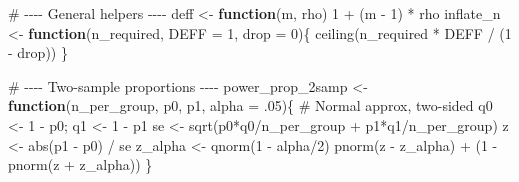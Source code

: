 \documentclass[
  letterpaper,
  DIV=11,
  numbers=noendperiod]{scrreprt}
\newenvironment{Shaded}{\begin{snugshade}}{\end{snugshade}}
\newcommand{\AttributeTok}[1]{\textcolor[rgb]{0.40,0.45,0.13}{#1}}
\newcommand{\CommentTok}[1]{\textcolor[rgb]{0.37,0.37,0.37}{#1}}
\newcommand{\ControlFlowTok}[1]{\textcolor[rgb]{0.00,0.23,0.31}{\textbf{#1}}}
\newcommand{\DecValTok}[1]{\textcolor[rgb]{0.68,0.00,0.00}{#1}}
\newcommand{\FunctionTok}[1]{\textcolor[rgb]{0.28,0.35,0.67}{#1}}
\newcommand{\NormalTok}[1]{\textcolor[rgb]{0.00,0.23,0.31}{#1}}
\newcommand{\OtherTok}[1]{\textcolor[rgb]{0.00,0.23,0.31}{#1}}
\newcommand{\SpecialCharTok}[1]{\textcolor[rgb]{0.37,0.37,0.37}{#1}}
\begin{document}
\begin{Shaded}
\begin{Highlighting}[]
\CommentTok{\# {-}{-}{-}{-} General helpers {-}{-}{-}{-}}
\NormalTok{deff }\OtherTok{\textless{}{-}} \ControlFlowTok{function}\NormalTok{(m, rho) }\DecValTok{1} \SpecialCharTok{+}\NormalTok{ (m }\SpecialCharTok{{-}} \DecValTok{1}\NormalTok{) }\SpecialCharTok{*}\NormalTok{ rho}
\NormalTok{inflate\_n }\OtherTok{\textless{}{-}} \ControlFlowTok{function}\NormalTok{(n\_required, }\AttributeTok{DEFF =} \DecValTok{1}\NormalTok{, }\AttributeTok{drop =} \DecValTok{0}\NormalTok{)\{}
  \FunctionTok{ceiling}\NormalTok{(n\_required }\SpecialCharTok{*}\NormalTok{ DEFF }\SpecialCharTok{/}\NormalTok{ (}\DecValTok{1} \SpecialCharTok{{-}}\NormalTok{ drop))}
\NormalTok{\}}

\CommentTok{\# {-}{-}{-}{-} Two{-}sample proportions {-}{-}{-}{-}}
\NormalTok{power\_prop\_2samp }\OtherTok{\textless{}{-}} \ControlFlowTok{function}\NormalTok{(n\_per\_group, p0, p1, }\AttributeTok{alpha =}\NormalTok{ .}\DecValTok{05}\NormalTok{)\{}
  \CommentTok{\# Normal approx, two{-}sided}
\NormalTok{  q0 }\OtherTok{\textless{}{-}} \DecValTok{1} \SpecialCharTok{{-}}\NormalTok{ p0; q1 }\OtherTok{\textless{}{-}} \DecValTok{1} \SpecialCharTok{{-}}\NormalTok{ p1}
\NormalTok{  se }\OtherTok{\textless{}{-}} \FunctionTok{sqrt}\NormalTok{(p0}\SpecialCharTok{*}\NormalTok{q0}\SpecialCharTok{/}\NormalTok{n\_per\_group }\SpecialCharTok{+}\NormalTok{ p1}\SpecialCharTok{*}\NormalTok{q1}\SpecialCharTok{/}\NormalTok{n\_per\_group)}
\NormalTok{  z  }\OtherTok{\textless{}{-}} \FunctionTok{abs}\NormalTok{(p1 }\SpecialCharTok{{-}}\NormalTok{ p0) }\SpecialCharTok{/}\NormalTok{ se}
\NormalTok{  z\_alpha }\OtherTok{\textless{}{-}} \FunctionTok{qnorm}\NormalTok{(}\DecValTok{1} \SpecialCharTok{{-}}\NormalTok{ alpha}\SpecialCharTok{/}\DecValTok{2}\NormalTok{)}
  \FunctionTok{pnorm}\NormalTok{(z }\SpecialCharTok{{-}}\NormalTok{ z\_alpha) }\SpecialCharTok{+}\NormalTok{ (}\DecValTok{1} \SpecialCharTok{{-}} \FunctionTok{pnorm}\NormalTok{(z }\SpecialCharTok{+}\NormalTok{ z\_alpha))}
\NormalTok{\}}


\end{Highlighting}
\end{Shaded}
\end{document}
